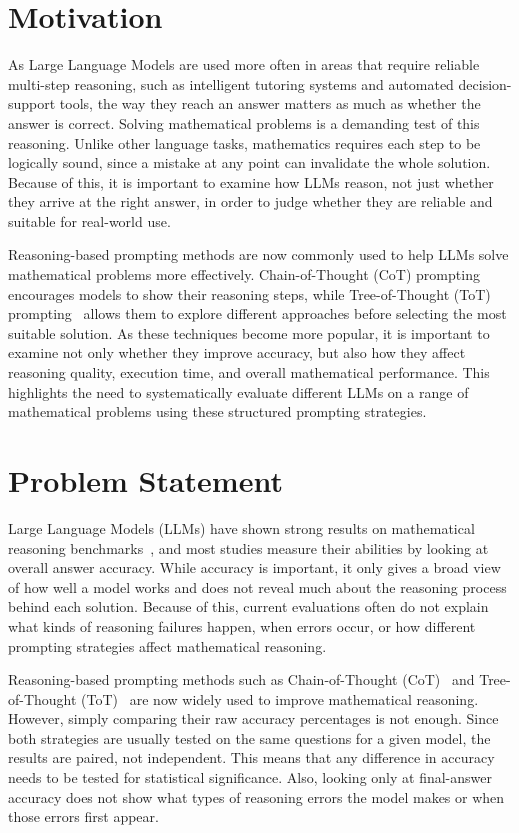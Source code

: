 \section{Motivation}

As Large Language Models are used more often in areas that require
reliable multi-step reasoning, such as intelligent tutoring systems and
automated decision-support tools, the way they reach an answer matters as
much as whether the answer is correct. Solving mathematical problems is a
demanding test of this reasoning. Unlike other language tasks, mathematics
requires each step to be logically sound, since a mistake at any point can
invalidate the whole solution. Because of this, it is important to examine
how LLMs reason, not just whether they arrive at the right answer, in
order to judge whether they are reliable and suitable for real-world use.

Reasoning-based prompting methods are now commonly used to help LLMs solve
mathematical problems more effectively. Chain-of-Thought (CoT)
prompting~\cite{wei2022chain} encourages models to show their reasoning
steps, while Tree-of-Thought (ToT) prompting~\cite{yao2023tree} allows
them to explore different approaches before selecting the most suitable
solution. As these techniques become more popular, it is important to
examine not only whether they improve accuracy, but also how they affect
reasoning quality, execution time, and overall mathematical performance.
This highlights the need to systematically evaluate different LLMs on a
range of mathematical problems using these structured prompting
strategies.

\section{Problem Statement}

Large Language Models (LLMs) have shown strong results on mathematical
reasoning benchmarks~\cite{hendrycks2021measuring}, and most studies
measure their abilities by looking at overall answer accuracy. While
accuracy is important, it only gives a broad view of how well a model
works and does not reveal much about the reasoning process behind each
solution. Because of this, current evaluations often do not explain what
kinds of reasoning failures happen, when errors occur, or how different
prompting strategies affect mathematical reasoning.

Reasoning-based prompting methods such as Chain-of-Thought
(CoT)~\cite{wei2022chain} and Tree-of-Thought (ToT)~\cite{yao2023tree} are
now widely used to improve mathematical reasoning. However, simply
comparing their raw accuracy percentages is not enough. Since both
strategies are usually tested on the same questions for a given model, the
results are paired, not independent. This means that any difference in
accuracy needs to be tested for statistical significance. Also, looking
only at final-answer accuracy does not show what types of reasoning errors
the model makes or when those errors first appear.

